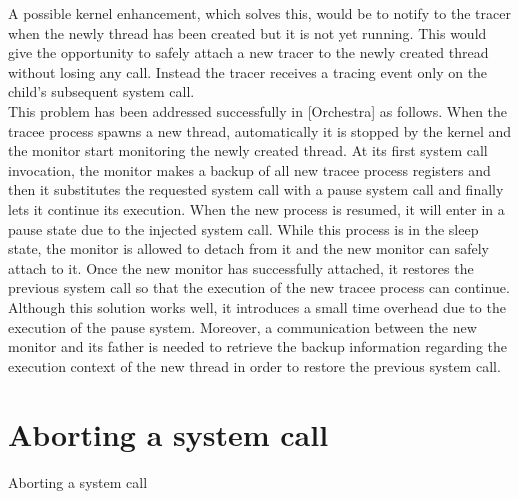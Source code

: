 A possible kernel enhancement, which solves this, would be to notify to the tracer when the newly thread has been created but it is not yet running. This would give the opportunity to safely attach a new tracer to the newly created thread without losing any call. Instead the tracer receives a tracing event only on the child’s subsequent system call.\\
This problem has been addressed successfully in [Orchestra] as follows.  When the tracee process spawns a new thread, automatically it is stopped by the kernel and the monitor start monitoring the newly created thread. At its first system call invocation, the monitor makes a backup of all new tracee process registers and then it substitutes the requested system call with a pause system call and finally lets it continue its execution.  When the new process is resumed, it will enter in a pause state due to the injected system call. While this process is in the sleep state, the monitor is allowed to detach from it and the new monitor can safely attach to it. Once the new monitor has successfully attached, it restores the previous system call so that the execution of the new tracee process can continue. Although this solution works well, it introduces a small time overhead due to the execution of the pause system.  Moreover, a communication between the new monitor and its father is needed to retrieve the backup information regarding the execution context of the new thread in order to restore the previous system call. \\

\section{Aborting a system call}
\label{aborting_systemcall}
Aborting a system call

